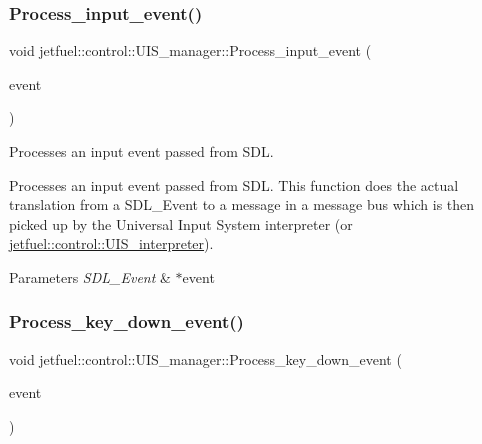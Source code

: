 \subsubsection{\texorpdfstring{Process\+\_\+input\+\_\+event()}{Process\_input\_event()}}
{\footnotesize\ttfamily void jetfuel\+::control\+::\+U\+I\+S\+\_\+manager\+::\+Process\+\_\+input\+\_\+event (\begin{DoxyParamCaption}\item[{S\+D\+L\+\_\+\+Event $\ast$}]{event }\end{DoxyParamCaption})}



Processes an input event passed from S\+DL. 

Processes an input event passed from S\+DL. This function does the actual translation from a S\+D\+L\+\_\+\+Event to a message in a message bus which is then picked up by the Universal Input System interpreter (or \hyperlink{classjetfuel_1_1control_1_1UIS__interpreter}{jetfuel\+::control\+::\+U\+I\+S\+\_\+interpreter}).


\begin{DoxyParams}{Parameters}
{\em S\+D\+L\+\_\+\+Event} & $\ast$event \\
\hline
\end{DoxyParams}
\mbox{\label{classjetfuel_1_1control_1_1UIS__manager_a93f728a261ed7f901aad2f5707b46ca8}} 
\subsubsection{\texorpdfstring{Process\+\_\+key\+\_\+down\+\_\+event()}{Process\_key\_down\_event()}}
{\footnotesize\ttfamily void jetfuel\+::control\+::\+U\+I\+S\+\_\+manager\+::\+Process\+\_\+key\+\_\+down\+\_\+event (\begin{DoxyParamCaption}\item[{S\+D\+L\+\_\+\+Event $\ast$}]{event }\end{DoxyParamCaption})\hspace{0.3cm}{\ttfamily [protected]}}




